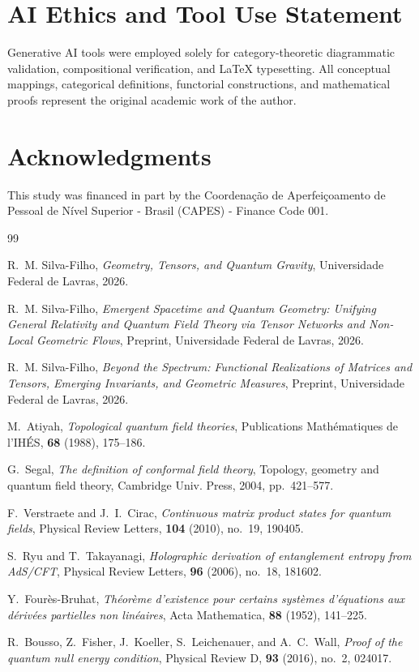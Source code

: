 \documentclass[11pt,a4paper,reqno]{amsart}
\theoremstyle{definition}
\numberwithin{equation}{section}
\begin{document}
\section*{AI Ethics and Tool Use Statement}
Generative AI tools were employed solely for category-theoretic diagrammatic validation, compositional verification, and \LaTeX{} typesetting. All conceptual mappings, categorical definitions, functorial constructions, and mathematical proofs represent the original academic work of the author.

\section*{Acknowledgments}
This study was financed in part by the Coordena\c{c}\~ao de Aperfei\c{c}oamento de Pessoal de N\'ivel Superior - Brasil (CAPES) - Finance Code 001.

\begin{thebibliography}{99}

R.~M. Silva-Filho,
\emph{Geometry, Tensors, and Quantum Gravity},
Universidade Federal de Lavras, 2026.

R.~M. Silva-Filho,
\emph{Emergent Spacetime and Quantum Geometry: Unifying General Relativity and Quantum Field Theory via Tensor Networks and Non-Local Geometric Flows},
Preprint, Universidade Federal de Lavras, 2026.

R.~M. Silva-Filho,
\emph{Beyond the Spectrum: Functional Realizations of Matrices and Tensors, Emerging Invariants, and Geometric Measures},
Preprint, Universidade Federal de Lavras, 2026.

M.~Atiyah,
\emph{Topological quantum field theories},
Publications Math\'ematiques de l'IH\'ES, \textbf{68} (1988), 175--186.

G.~Segal,
\emph{The definition of conformal field theory},
Topology, geometry and quantum field theory, Cambridge Univ. Press, 2004, pp.~421--577.

F.~Verstraete and J.~I.~Cirac,
\emph{Continuous matrix product states for quantum fields},
Physical Review Letters, \textbf{104} (2010), no.~19, 190405.

S.~Ryu and T.~Takayanagi,
\emph{Holographic derivation of entanglement entropy from AdS/CFT},
Physical Review Letters, \textbf{96} (2006), no.~18, 181602.

Y.~Four\`es-Bruhat,
\emph{Th\'eor\`eme d'existence pour certains syst\`emes d'\'equations aux d\'eriv\'ees partielles non lin\'eaires},
Acta Mathematica, \textbf{88} (1952), 141--225.

R.~Bousso, Z.~Fisher, J.~Koeller, S.~Leichenauer, and A.~C.~Wall,
\emph{Proof of the quantum null energy condition},
Physical Review D, \textbf{93} (2016), no.~2, 024017.

\end{thebibliography}
\end{document}

